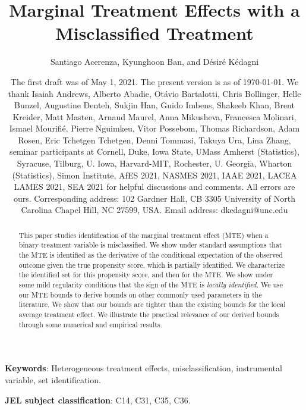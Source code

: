 \documentclass[11pt,reqno]{amsart}
\theoremstyle{plain}
\numberwithin{equation}{section}
\begin{document}
\nonstopmode

\title[Marginal Treatment Effects with a Misclassified Treatment]{Marginal Treatment Effects with a Misclassified Treatment}
\author{Santiago Acerenza, Kyunghoon Ban, and D\'esir\'e K\'edagni}
\address{ORT Uruguay, Iowa State, and UNC-Chapel Hill} 
\noindent \date{\scriptsize{The first draft was of May 1, 2021. The present version is as of \today. We thank Isaiah Andrews, Alberto Abadie, Ot\'avio Bartalotti, Chris Bollinger, Helle Bunzel, Augustine Denteh, Sukjin Han, Guido Imbens, Shakeeb Khan, Brent Kreider, Matt Masten, Arnaud Maurel, Anna Mikusheva, Francesca Molinari, Ismael Mourifi\'e, Pierre Nguimkeu, Vitor Possebom, Thomas Richardson, Adam Rosen, Eric Tchetgen Tchetgen, Denni Tommasi, Takuya Ura, Lina Zhang, seminar participants at Cornell, Duke, Iowa State, UMass Amherst (Statistics), Syracuse, Tilburg, U. Iowa, Harvard-MIT, Rochester, U. Georgia, Wharton (Statistics), Simon Institute, AfES 2021, NASMES 2021, IAAE 2021, LACEA LAMES 2021, SEA 2021 for helpful discussions and comments. All errors are ours.
Corresponding address: 102 Gardner Hall, CB 3305 University of North Carolina Chapel Hill, NC 27599, USA. Email address: dkedagni@unc.edu}}

\begin{abstract}
This paper studies identification of the marginal treatment effect (MTE) when a binary treatment variable is misclassified. We show under standard assumptions that the MTE is identified as the derivative of the conditional expectation of the observed outcome given the true propensity score, which is partially identified. We characterize the identified set for this propensity score, and then for the MTE. We show under some mild regularity conditions that the sign of the MTE is \textit{locally identified}. We use our MTE bounds to derive bounds on other commonly used parameters in the literature. We show that  our bounds are tighter than the existing bounds for the local average treatment effect. We illustrate the practical relevance of our derived bounds through some numerical and empirical results.
\end{abstract}
\maketitle
 \maketitle
{\footnotesize \textbf{Keywords}: Heterogeneous treatment effects, misclassification, instrumental variable, set identification.

\textbf{JEL subject classification}: C14, C31, C35, C36.}
\clearpage
\end{document}
